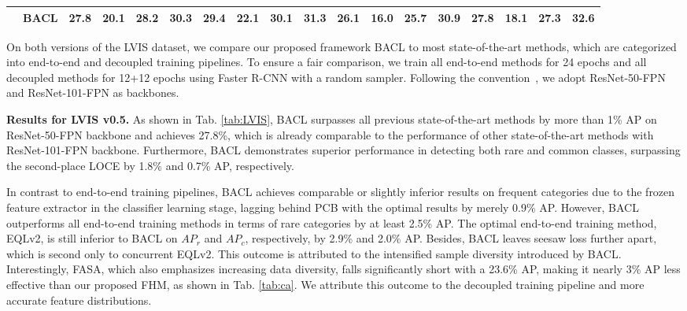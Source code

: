 \documentclass[lettersize,journal]{IEEEtran}
\begin{document}
\begin{table*}[t]
{\begin{tabular}{c|c|cccccccc|cccccccc}
                                     & BACL                     & \textbf{27.8} & \textbf{20.1} & \textbf{28.2} & \multicolumn{1}{c|}{30.3}          & \textbf{29.4} & \textbf{22.1} & \textbf{30.1} & 31.3          & \multicolumn{1}{c|}{\textbf{26.1}} & \textbf{16.0} & \textbf{25.7} & \multicolumn{1}{c|}{30.9}          & \multicolumn{1}{c|}{\textbf{27.8}} & 18.1          & \textbf{27.3} & 32.6          \\ \hline
        \end{tabular}}
    \label{tab:LVIS}
    \vspace{-4mm}
\end{table*}

On both versions of the LVIS dataset, we compare our proposed framework BACL to most state-of-the-art methods, which are categorized into end-to-end and decoupled training pipelines.
To ensure a fair comparison, we train all end-to-end methods for 24 epochs and all decoupled methods for 12+12 epochs using Faster R-CNN with a random sampler.
Following the convention~\cite{tan2021equalization,feng2021exploring}, we adopt ResNet-50-FPN and ResNet-101-FPN as backbones.




\noindent\textbf{Results for LVIS v0.5.}
As shown in Tab. \ref{tab:LVIS}, BACL surpasses all previous state-of-the-art methods by more than 1\% AP on ResNet-50-FPN backbone and achieves 27.8\%, which is already comparable to the performance of other state-of-the-art methods with ResNet-101-FPN backbone.
Furthermore, BACL demonstrates superior performance in detecting both rare and common classes, surpassing the second-place LOCE by 1.8\% and 0.7\% AP, respectively.

In contrast to end-to-end training pipelines, BACL achieves comparable or slightly inferior results on frequent categories due to the frozen feature extractor in the classifier learning stage, lagging behind PCB with the optimal results by merely 0.9\% AP.
However, BACL outperforms all end-to-end training methods in terms of rare categories by at least 2.5\% AP.
The optimal end-to-end training method, EQLv2, is still inferior to BACL on $AP_r$ and $AP_c$, respectively, by 2.9\% and 2.0\% AP.
Besides, BACL leaves seesaw loss further apart, which is second only to concurrent EQLv2.
This outcome is attributed to the intensified sample diversity introduced by BACL.
Interestingly, FASA, which also emphasizes increasing data diversity, falls significantly short with a 23.6\% AP, making it nearly 3\% AP less effective than our proposed FHM, as shown in Tab. \ref{tab:ca}.
We attribute this outcome to the decoupled training pipeline and more accurate feature distributions.
\end{document}
